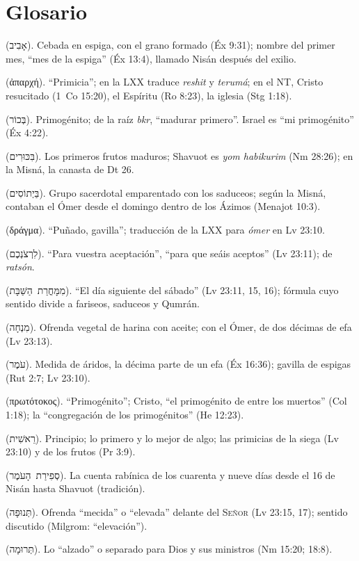 \documentclass[11pt,letterpaper]{article}
\newcommand{\heb}[1]{\mbox{\foreignlanguage{hebrew}{#1}}}
\newcommand{\grc}[1]{\foreignlanguage{ancientgreek}{#1}}
\newcommand{\SENOR}{\textsc{Señor}}
\begin{document}
\section*{Glosario}
\begin{description}\small
\item[Abib] (\heb{אָבִיב}). Cebada en espiga, con el grano formado (Éx 9:31); nombre del primer mes, ``mes de la espiga'' (Éx 13:4), llamado Nisán después del exilio.
\item[Aparjé] (\grc{ἀπαρχή}). ``Primicia''; en la LXX traduce \emph{reshit} y \emph{terumá}; en el NT, Cristo resucitado (1~Co 15:20), el Espíritu (Ro 8:23), la iglesia (Stg 1:18).
\item[Bejor] (\heb{בְּכוֹר}). Primogénito; de la raíz \emph{bkr}, ``madurar primero''. Israel es ``mi primogénito'' (Éx 4:22).
\item[Bikurim] (\heb{בִּכּוּרִים}). Los primeros frutos maduros; Shavuot es \emph{yom habikurim} (Nm 28:26); en la Misná, la canasta de Dt 26.
\item[Boetusianos] (\heb{בַּיְתוֹסִים}). Grupo sacerdotal emparentado con los saduceos; según la Misná, contaban el Ómer desde el domingo dentro de los Ázimos (Menajot 10:3).
\item[Drágma] (\grc{δράγμα}). ``Puñado, gavilla''; traducción de la LXX para \emph{ómer} en Lv 23:10.
\item[Lirtsonjem] (\heb{לִרְצֹנְכֶם}). ``Para vuestra aceptación'', ``para que seáis aceptos'' (Lv 23:11); de \emph{ratsón}.
\item[Mimojorat hashabat] (\heb{מִמָּחֳרַת הַשַּׁבָּת}). ``El día siguiente del sábado'' (Lv 23:11, 15, 16); fórmula cuyo sentido divide a fariseos, saduceos y Qumrán.
\item[Minjá] (\heb{מִנְחָה}). Ofrenda vegetal de harina con aceite; con el Ómer, de dos décimas de efa (Lv 23:13).
\item[Ómer] (\heb{עֹמֶר}). Medida de áridos, la décima parte de un efa (Éx 16:36); gavilla de espigas (Rut 2:7; Lv 23:10).
\item[Prōtótokos] (\grc{πρωτότοκος}). ``Primogénito''; Cristo, ``el primogénito de entre los muertos'' (Col 1:18); la ``congregación de los primogénitos'' (He 12:23).
\item[Reshit] (\heb{רֵאשִׁית}). Principio; lo primero y lo mejor de algo; las primicias de la siega (Lv 23:10) y de los frutos (Pr 3:9).
\item[Sefirat haómer] (\heb{סְפִירַת הָעֹמֶר}). La cuenta rabínica de los cuarenta y nueve días desde el 16 de Nisán hasta Shavuot (tradición).
\item[Tenufá] (\heb{תְּנוּפָה}). Ofrenda ``mecida'' o ``elevada'' delante del \SENOR{} (Lv 23:15, 17); sentido discutido (Milgrom: ``elevación'').
\item[Terumá] (\heb{תְּרוּמָה}). Lo ``alzado'' o separado para Dios y sus ministros (Nm 15:20; 18:8).
\end{description}
\end{document}
